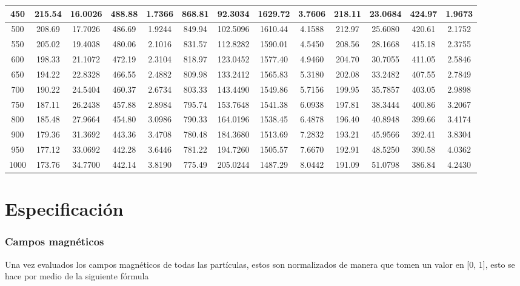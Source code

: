 \documentclass[12pt]{article}
\begin{document}
\begin{table}[ht]
{\begin{tabular}{ |c |c | c | c | c | c | c | c | c | c | c | c | c | }
      450
      & 215.54 & 16.0026 & 488.88 & 1.7366
      & 868.81 & 92.3034 & 1629.72 & 3.7606
      & 218.11 & 23.0684 & 424.97 & 1.9673 \\ \hline
      500
      & 208.69 & 17.7026 & 486.69 & 1.9244
      & 849.94 & 102.5096 & 1610.44 & 4.1588
      & 212.97 & 25.6080 & 420.61 & 2.1752 \\ \hline
      550
      & 205.02 & 19.4038 & 480.06 & 2.1016
      & 831.57 & 112.8282 & 1590.01 & 4.5450
      & 208.56 & 28.1668 & 415.18 & 2.3755 \\ \hline
      600
      & 198.33 & 21.1072 & 472.19 & 2.3104
      & 818.97 & 123.0452 & 1577.40 & 4.9460
      & 204.70 & 30.7055 & 411.05 & 2.5846 \\ \hline
      650
      & 194.22 & 22.8328 & 466.55 & 2.4882
      & 809.98 & 133.2412 & 1565.83 & 5.3180
      & 202.08 & 33.2482 & 407.55 & 2.7849 \\ \hline
      700
      & 190.22 & 24.5404 & 460.37 & 2.6734
      & 803.33 & 143.4490 & 1549.86 & 5.7156
      & 199.95 & 35.7857 & 403.05 & 2.9898 \\ \hline
      750
      & 187.11 & 26.2438 & 457.88 & 2.8984
      & 795.74 & 153.7648 & 1541.38 & 6.0938
      & 197.81 & 38.3444 & 400.86 & 3.2067 \\ \hline
      800
      & 185.48 & 27.9664 & 454.80 & 3.0986
      & 790.33 & 164.0196 & 1538.45 & 6.4878
      & 196.40 & 40.8948 & 399.66 & 3.4174 \\ \hline
      900
      & 179.36 & 31.3692 & 443.36 & 3.4708
      & 780.48 & 184.3680 & 1513.69 & 7.2832
      & 193.21 & 45.9566 & 392.41 & 3.8304 \\ \hline
      950
      & 177.12 & 33.0692 & 442.28 & 3.6446
      & 781.22 & 194.7260 & 1505.57 & 7.6670
      & 192.91 & 48.5250 & 390.58 & 4.0362 \\ \hline
      1000
      & 173.76 & 34.7700 & 442.14 & 3.8190
      & 775.49 & 205.0244 & 1487.29 & 8.0442
      & 191.09 & 51.0798 & 386.84 & 4.2430 \\ \hline
    \end{tabular}
  }
\end{table}

\section{Especificación}

\subsubsection*{Campos magnéticos}
Una vez evaluados los campos magnéticos de todas las partículas, estos son normalizados de manera que tomen un valor en [0, 1], esto se hace por medio de la siguiente fórmula
\end{document}

